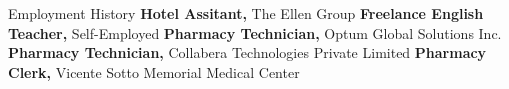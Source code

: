 \begin{rubric}{\faBriefcase[solid] Employment History}
\entry*[2025 -- now][]%
	\textbf{Hotel Assitant,} The Ellen Group
\entry*[2021 -- 2023][]%
	\textbf{Freelance English Teacher,} Self-Employed
\entry*[2018 -- 2018][]%
	\textbf{Pharmacy Technician,} Optum Global Solutions Inc.
\entry*[2017 -- 2017][]%
	\textbf{Pharmacy Technician,} Collabera Technologies Private Limited
\entry*[2016 -- 2016][]%
	\textbf{Pharmacy Clerk,} Vicente Sotto Memorial Medical Center 
%
\end{rubric}